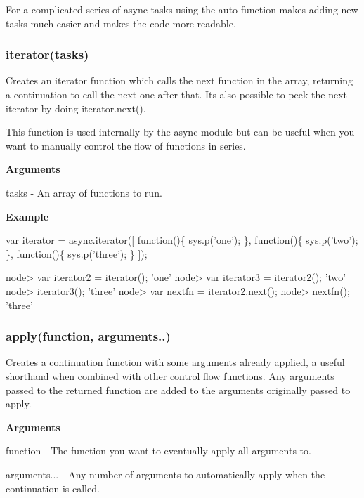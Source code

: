 For a complicated series of async tasks using the auto function makes adding new tasks much easier and makes the code more readable.





\label{_iterator}%
 \subsubsection*{iterator(tasks)}

Creates an iterator function which calls the next function in the array, returning a continuation to call the next one after that. It\textquotesingle{}s also possible to \textquotesingle{}peek\textquotesingle{} the next iterator by doing iterator.\+next().

This function is used internally by the async module but can be useful when you want to manually control the flow of functions in series.

{\bfseries Arguments}


\begin{DoxyItemize}
\item tasks -\/ An array of functions to run.
\end{DoxyItemize}

{\bfseries Example}


\begin{DoxyCode}
var iterator = async.iterator([
    function()\{ sys.p('one'); \},
    function()\{ sys.p('two'); \},
    function()\{ sys.p('three'); \}
]);

node> var iterator2 = iterator();
'one'
node> var iterator3 = iterator2();
'two'
node> iterator3();
'three'
node> var nextfn = iterator2.next();
node> nextfn();
'three'
\end{DoxyCode}
 



\label{_apply}%
 \subsubsection*{apply(function, arguments..)}

Creates a continuation function with some arguments already applied, a useful shorthand when combined with other control flow functions. Any arguments passed to the returned function are added to the arguments originally passed to apply.

{\bfseries Arguments}


\begin{DoxyItemize}
\item function -\/ The function you want to eventually apply all arguments to.
\item arguments... -\/ Any number of arguments to automatically apply when the continuation is called.
\end{DoxyItemize}

